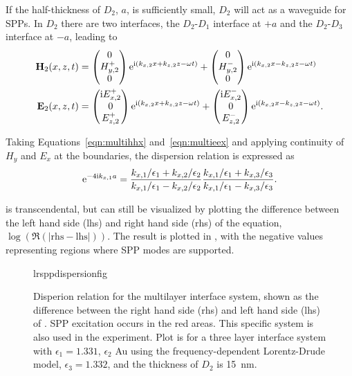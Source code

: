 If the half-thickness of $D_2$, $a$, is sufficiently small, $D_2$ will act
as a waveguide for SPPs.  In $D_2$ there are two interfaces, the
$D_2$-$D_1$ interface at $+a$ and the $D_2$-$D_3$ interface at $-a$,
leading to
\begin{align}
\mathbf{H}_2(x,z,t) &=
\begin{pmatrix}
0\\
H^+_{y,2}\\
0
\end{pmatrix} {\mathrm{e}}^{{\mathrm{i}}(k_{x,2}x+k_{z,2}z-\omega t)}
+
\begin{pmatrix}
0\\
H^-_{y,2}\\
0
\end{pmatrix} {\mathrm{e}}^{{\mathrm{i}}(k_{x,2}x-k_{z,2}z-\omega t)} \label{eqn:multihhx} \\
\mathbf{E}_2(x,z,t) &=
\begin{pmatrix}
{\mathrm{i}} E^+_{x,2}\\
0\\
E^+_{z,2}\\
\end{pmatrix} {\mathrm{e}}^{{\mathrm{i}}(k_{x,2}x+k_{z,2}z-\omega t)}
+
\begin{pmatrix}
{\mathrm{i}} E^-_{x,2}\\
0\\
E^-_{z,2}\\
\end{pmatrix} {\mathrm{e}}^{{\mathrm{i}}(k_{x,2}x-k_{z,2}z-\omega t)}.
\label{eqn:multieex}
\end{align}

Taking Equations~\ref{eqn:multihhx} and~\ref{eqn:multieex} and applying
continuity of $H_y$ and $E_x$ at the boundaries, the dispersion relation is
expressed as
\begin{equation}
{\mathrm{e}}^{-4 {\mathrm{i}} k_{x,1} a} = 
\frac{k_{x,1}/\epsilon_1 + k_{x,2}/\epsilon_2}
     {k_{x,1}/\epsilon_1 - k_{x,2}/\epsilon_2}
\frac{k_{x,1}/\epsilon_1 + k_{x,3}/\epsilon_3}
     {k_{x,1}/\epsilon_1 - k_{x,3}/\epsilon_3}.
\label{eqn:lrsppdispersion}
\end{equation}

 is transcendental, but can still be
visualized by plotting the difference between the left hand side (lhs) and
right hand side (rhs) of the equation, 
$\log\left(\Re\left(|\mathrm{rhs}-\mathrm{lhs}|\right)\right)$.  The result
is plotted in , with the negative
values representing regions where SPP modes are supported.

\begin{figure}[ht]
 \centering
{lrsppdispersionfig}
\caption{Disperion relation for the multilayer interface system, shown as the difference
 between the right hand side (rhs) and left hand side (lhs) of
.  SPP excitation occurs in the red areas.
This specific system is also used in the experiment.  Plot is for a three
layer interface system with $\epsilon_1=1.331$, $\epsilon_2$ Au using the
frequency-dependent Lorentz-Drude model, $\epsilon_3=1.332$, and the
thickness of $D_2$ is \SI{15}{\nano\meter}.  }
\label{fig:lrsppdispersionrelation}
\end{figure}

